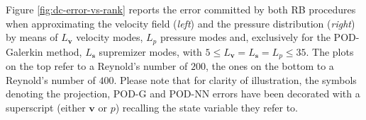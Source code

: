 \documentclass{elsarticle}
\numberwithin{equation}{section}
\theoremstyle{theorem}
\theoremstyle{definition}
\theoremstyle{remark}
\theoremstyle{proposition}
\numberwithin{figure}{section}
\newcommand{\bg}[1]{\boldsymbol{#1}}
\begin{document}
		Figure \ref{fig:dc-error-vs-rank} reports the error committed by both RB procedures when approximating the velocity field (\emph{left}) and the pressure distribution (\emph{right}) by means of $L_{\bg{v}}$ velocity modes, $L_p$ pressure modes and, exclusively for the POD-Galerkin method, $L_{\bg{s}}$ supremizer modes, with $5 \leq L_{\bg{v}} = L_{\bg{s}} = L_p \leq 35$. The plots on the top refer to a Reynold's number of $200$, the ones on the bottom to a Reynold's number of $400$. Please note that for clarity of illustration, the symbols denoting the projection, POD-G and POD-NN errors have been decorated with a superscript (either $\bg{v}$ or $p$) recalling the state variable they refer to. 
		
		\iffalse
		\begin{figure}[t!]
			\center
			\vspace*{-0.5cm}

\end{figure}
\end{document}
